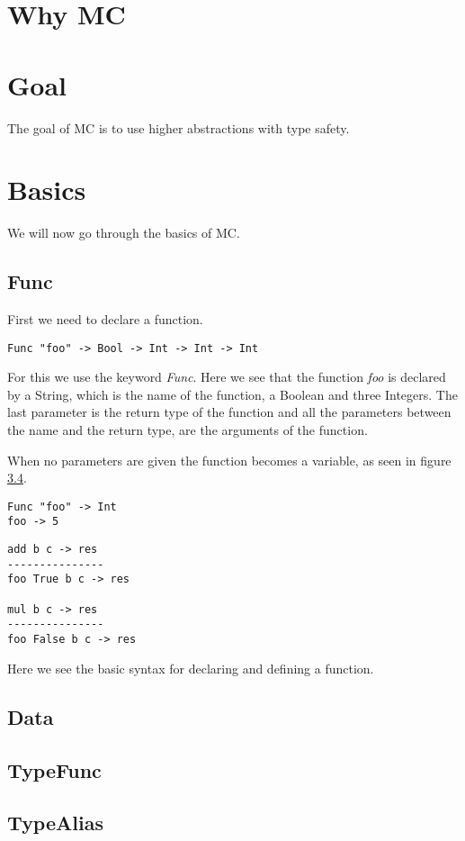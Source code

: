 \section{Why MC}


\section{Goal}
The goal of MC is to use higher abstractions with type safety.

\section{Basics}
We will now go through the basics of MC.

\subsection{Func}
First we need to declare a function.
   \begin{lstlisting}
Func "foo" -> Bool -> Int -> Int -> Int
   \end{lstlisting}
   For this we use the keyword \emph{Func}.
   Here we see that the function \emph{foo} is declared by a String, which is the name of the function, a Boolean and three Integers.
   The last parameter is the return type of the function and all the parameters between the name and the return type, are the arguments of the function.

   When no parameters are given the function becomes a variable, as seen in figure \ref{}.
   \begin{lstlisting}
Func "foo" -> Int
foo -> 5
   \end{lstlisting}

   \begin{lstlisting}
add b c -> res
---------------
foo True b c -> res

mul b c -> res
---------------
foo False b c -> res
   \end{lstlisting}

   Here we see the basic syntax for declaring and defining a function.

\subsection{Data}
\subsection{TypeFunc}
\subsection{TypeAlias}
